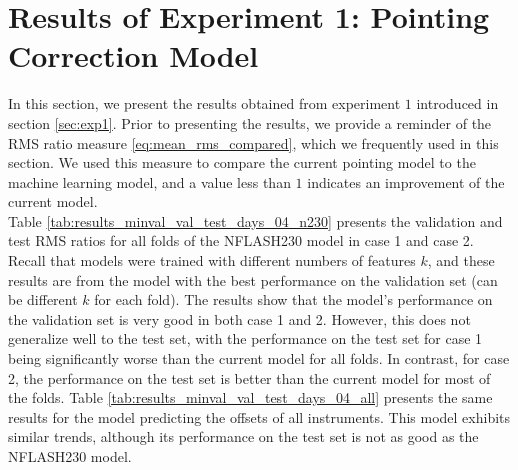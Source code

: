 \section{Results of Experiment 1: Pointing Correction Model}
In this section, we present the results obtained from experiment $1$ introduced in section \ref{sec:exp1}.
Prior to presenting the results, we provide a reminder of the RMS ratio measure \eqref{eq:mean_rms_compared}, which we frequently used in this section.
We used this measure to compare the current pointing model to the machine learning model, and a value less than $1$ indicates an improvement of the current model. \\

Table \ref{tab:results_minval_val_test_days_04_n230} presents the validation and test RMS ratios for all folds of the NFLASH230 model in case 1 and case 2.
Recall that models were trained with different numbers of features $k$, and these results are from the model with the best performance on the validation set (can be different $k$ for each fold).
The results show that the model's performance on the validation set is very good in both case 1 and 2.
However, this does not generalize well to the test set, with the performance on the test set for case 1 being significantly worse than the current model for all folds.
In contrast, for case 2, the performance on the test set is better than the current model for most of the folds.
Table \ref{tab:results_minval_val_test_days_04_all} presents the same results for the model predicting the offsets of all instruments.
This model exhibits similar trends, although its performance on the test set is not as good as the NFLASH230 model.\\

